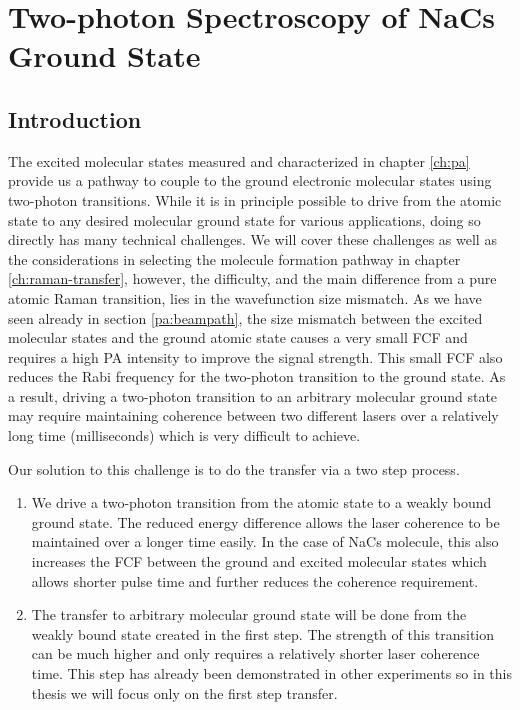 
\chapter{Two-photon Spectroscopy of NaCs Ground State}
\label{ch:raman-spectroscopy}

\section{Introduction}


The excited molecular states measured and characterized in chapter \ref{ch:pa}
provide us a pathway to couple to the ground electronic molecular states
using two-photon transitions.
While it is in principle possible to drive from the atomic state
to any desired molecular ground state for various applications,
doing so directly has many technical challenges.
We will cover these challenges as well as the considerations in selecting
the molecule formation pathway in chapter \ref{ch:raman-transfer},
however, the difficulty, and the main difference from a pure atomic Raman transition,
lies in the wavefunction size mismatch.
As we have seen already in section \ref{pa:beampath},
the size mismatch between the excited molecular states and the ground atomic state
causes a very small FCF and requires a high PA intensity to improve the signal strength.
This small FCF also reduces the Rabi frequency for the two-photon transition to the ground state.
As a result, driving a two-photon transition to an arbitrary molecular ground state
may require maintaining coherence between two different lasers over
a relatively long time (milliseconds) which is very difficult to achieve.

Our solution to this challenge is to do the transfer via a two step process.
\begin{enumerate}
\item We drive a two-photon transition from the atomic state to
  a weakly bound ground state.
  The reduced energy difference allows the laser coherence to be maintained
  over a longer time easily.
  In the case of NaCs molecule, this also increases the FCF
  between the ground and excited molecular states which allows shorter pulse time and
  further reduces the coherence requirement.
\item The transfer to arbitrary molecular ground state will be done from
  the weakly bound state created in the first step.
  The strength of this transition can be much higher
  and only requires a relatively shorter laser coherence time.
  This step has already been demonstrated in other experiments\cite{ni_high_2008}
  so in this thesis we will focus only on the first step transfer.
\end{enumerate}

